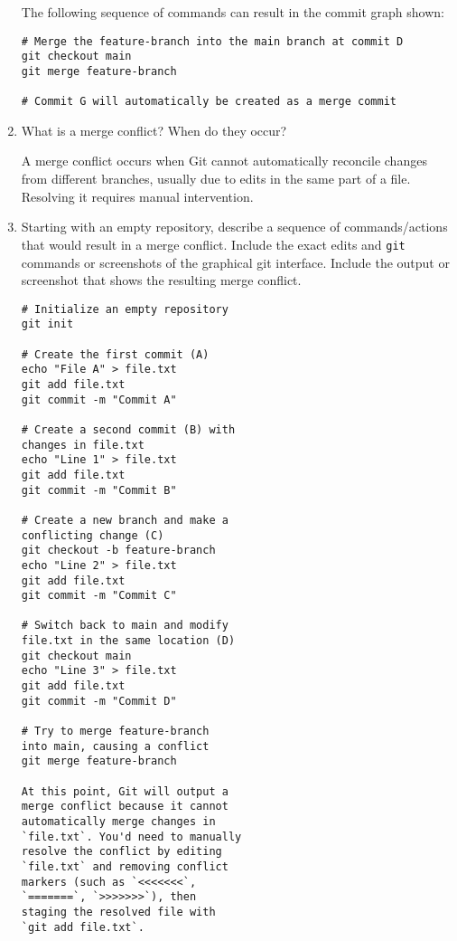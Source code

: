 \documentclass[10pt,twocolumn]{article}
\begin{document}
\begin{enumerate}
The following sequence of commands can result in the commit graph shown:

\begin{verbatim}
# Merge the feature-branch into the main branch at commit D
git checkout main
git merge feature-branch

# Commit G will automatically be created as a merge commit
\end{verbatim}

\item What is a merge conflict? When do they occur?

A merge conflict occurs when Git cannot automatically reconcile changes from different branches, usually due to edits in the same part of a file. Resolving it requires manual intervention.

\item Starting with an empty repository, describe a sequence of commands/actions that would result in a merge conflict. Include the exact edits and \texttt{git} commands or screenshots of the graphical git interface. Include the output or screenshot that shows the resulting merge conflict.


\begin{verbatim}
# Initialize an empty repository
git init

# Create the first commit (A)
echo "File A" > file.txt
git add file.txt
git commit -m "Commit A"

# Create a second commit (B) with 
changes in file.txt
echo "Line 1" > file.txt
git add file.txt
git commit -m "Commit B"

# Create a new branch and make a 
conflicting change (C)
git checkout -b feature-branch
echo "Line 2" > file.txt
git add file.txt
git commit -m "Commit C"

# Switch back to main and modify 
file.txt in the same location (D)
git checkout main
echo "Line 3" > file.txt
git add file.txt
git commit -m "Commit D"

# Try to merge feature-branch 
into main, causing a conflict
git merge feature-branch

At this point, Git will output a 
merge conflict because it cannot 
automatically merge changes in 
`file.txt`. You'd need to manually 
resolve the conflict by editing 
`file.txt` and removing conflict 
markers (such as `<<<<<<<`, 
`=======`, `>>>>>>>`), then 
staging the resolved file with 
`git add file.txt`.
\end{verbatim}

\end{enumerate}
\end{document}
